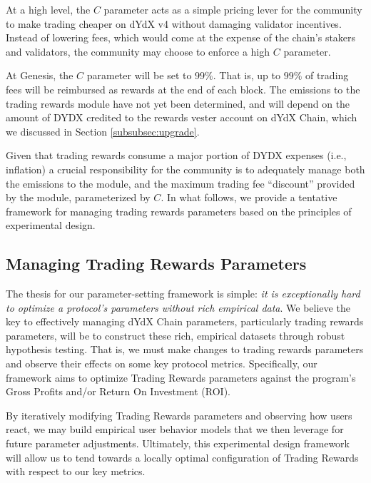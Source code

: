         At a high level, the $C$ parameter acts as a simple pricing lever for the community to make trading cheaper on dYdX v4 without damaging validator incentives. Instead of lowering fees, which would come at the expense of the chain's stakers and validators, the community may choose to enforce a high $C$ parameter. 

        At Genesis, the $C$ parameter will be set to $99\%$. That is, up to $99\%$ of trading fees will be reimbursed as rewards at the end of each block. The emissions to the trading rewards module have not yet been determined, and will depend on the amount of DYDX credited to the rewards vester account on dYdX Chain, which we discussed in Section \ref{subsubsec:upgrade}.

        Given that trading rewards consume a major portion of DYDX expenses (i.e., inflation) a crucial responsibility for the community is to adequately manage both the emissions to the module, and the maximum trading fee ``discount'' provided by the module, parameterized by $C$. In what follows, we provide a tentative framework for managing trading rewards parameters based on the principles of experimental design.
        
    \subsection{Managing Trading Rewards Parameters}
    
        The thesis for our parameter-setting framework is simple: \textit{it is exceptionally hard to optimize a protocol’s parameters without rich empirical data}. We believe the key to effectively managing dYdX Chain parameters, particularly trading rewards parameters, will be to construct these rich, empirical datasets through robust hypothesis testing. That is, we must make changes to trading rewards parameters and observe their effects on some key protocol metrics. Specifically, our framework aims to optimize Trading Rewards parameters against the program’s Gross Profits and/or Return On Investment (ROI).
        
        By iteratively modifying Trading Rewards parameters and observing how users react, we may build empirical user behavior models that we then leverage for future parameter adjustments. Ultimately, this experimental design framework will allow us to tend towards a locally optimal configuration of Trading Rewards with respect to our key metrics.

